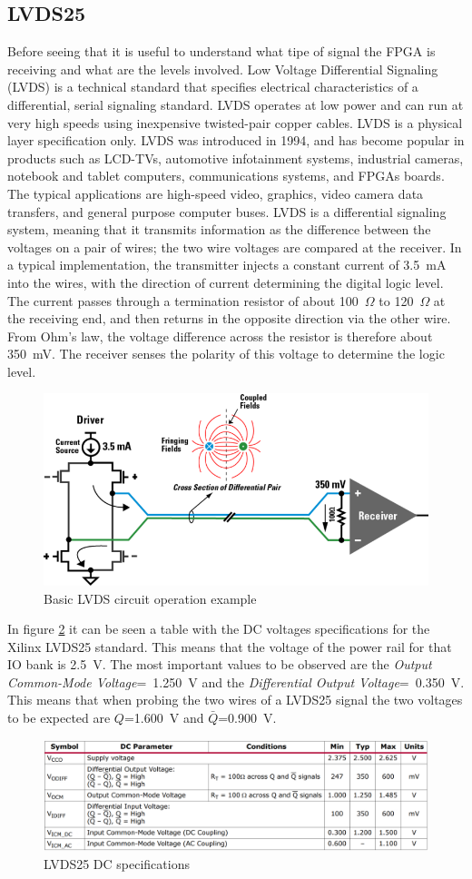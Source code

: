 \subsection{LVDS25}
Before seeing that it is useful to understand what tipe of signal the FPGA is receiving and what are the levels involved.
Low Voltage Differential Signaling\cite{lvds} (LVDS) is a technical standard that specifies electrical characteristics of a differential, serial signaling standard.
LVDS operates at low power and can run at very high speeds using inexpensive twisted-pair copper cables. LVDS is a physical layer specification only.
LVDS was introduced in 1994, and has become popular in products such as LCD-TVs, automotive infotainment systems, industrial cameras, notebook and tablet computers, communications systems, and FPGAs boards. The typical applications are high-speed video, graphics, video camera data transfers, and general purpose computer buses.
LVDS is a differential signaling system, meaning that it transmits information as the difference between the voltages on a pair of wires; the two wire voltages are compared at the receiver.
In a typical implementation, the transmitter injects a constant current of 3.5~mA into the wires, with the direction of current determining the digital logic level. The current passes through a termination resistor of about 100~$\Omega$ to 120~$\Omega$ at the receiving end, and then returns in the opposite direction via the other wire. From Ohm's law, the voltage difference across the resistor is therefore about 350~mV. The receiver senses the polarity of this voltage to determine the logic level.
\begin{figure}[H]
	\centering
	\includegraphics[width=0.4\linewidth]{IMG/ch3/LVDS}
	\caption{Basic LVDS circuit operation example}
	\label{fig:lvds}
\end{figure}
\noindent In figure \ref{fig:lvds25} it can be seen a table with the DC voltages specifications for the Xilinx LVDS25 standard. This means that the voltage of the power rail for that IO bank is 2.5~V. The most important values to be observed are the \textit{Output Common-Mode Voltage}=~1.250~V and the \textit{Differential Output Voltage}=~0.350~V. This means that when probing the two wires of a LVDS25 signal the two voltages to be expected are $Q$=1.600~V and $\bar{Q}$=0.900~V.
\begin{figure}[H]
	\centering
	\includegraphics[width=0.7\linewidth]{IMG/ch3/LVDS25SPEC}
	\caption{LVDS25 DC specifications}
	\label{fig:lvds25}
\end{figure}
